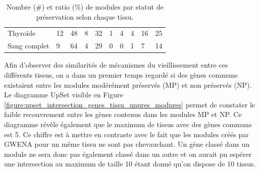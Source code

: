 \begin{table}[!ht]
{\begin{tabular}{llllllllll}
Thyroïde                        & 12                & 48              & 8                       & 32                   & 1                   & 4                 & 4                    & 16               & 25             \\
Sang complet                    & 9                 & 64              & 4                       & 29                   & 0                   & 0                 & 1                    & 7                & 14              
\end{tabular}
}
\caption{Nombre (\#) et ratio (\%) de modules par statut de préservation selon chaque tissu.}
\label{table:modules_status_all_tissues}
\end{table}


Afin d'observer des similarités de mécanismes du vieillissement entre ces différents tissus, on a dans un premier temps regardé si des gènes communs existaient entre les modules modérément préservés (MP) et non  préservés (NP). Le diagramme UpSet  visible en Figure \ref{figure:upset_intersection_genes_tissu_unpres_modpres} permet de constater le faible recouvrement entre les gènes contenus dans les modules MP et NP. Ce diagramme révèle également que le maximum de tissus avec des gènes communs est 5. Ce chiffre est à mettre en contraste avec le fait que les modules créés par GWENA pour un même tissu ne sont pas chevauchant. Un gène classé dans un module ne sera donc pas également classé dans un autre et on aurait pu espérer une intersection au maximum de taille 10 étant donné qu'on dispose de 10 tissus. 

